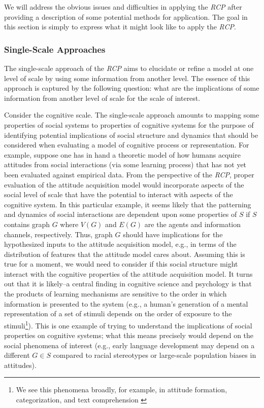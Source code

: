 \documentclass{article}
\begin{document}
We will address the obvious issues and difficulties in applying the \textit{RCP} after providing a description of some potential methods for application.  The goal in this section is simply to express what it might look like to apply the \textit{RCP}.  

\subsubsection{Single-Scale Approaches}
The single-scale approach of the \textit{RCP} aims to elucidate or refine a model at one level of scale by using some information from another level.  The essence of this approach is captured by the following question: what are the implications of some information from another level of scale for the scale of interest. 
 
Consider the cognitive scale. The single-scale approach amounts to mapping some properties of social systems to properties of cognitive systems for the purpose of identifying potential implications of social structure and dynamics that should be considered when evaluating a model of cognitive process or representation.  For example, suppose one has in hand a theoretic model of how humans acquire attitudes from social interactions (via some learning process) that has not yet been evaluated against empirical data.  From the perspective of the \textit{RCP}, proper evaluation of the attitude acquisition model would incorporate aspects of the social level of scale that have the potential to interact with aspects of the cognitive system.  In this particular example, it seems likely that the patterning and dynamics of social interactions are dependent upon some properties of $S$ if $S$ contains graph $G$ where $V(G)$ and $E(G)$ are the agents and information channels, respectively. Thus, graph $G$ should have implications for the hypothesized inputs to the attitude acquisition model, e.g., in terms of the distribution of features that the attitude model cares about.  Assuming this is true for a moment, we would need to consider if this social structure might interact with the cognitive properties of the attitude acquisition model.  It turns out that it is likely--a central finding in cognitive science and psychology is that the products of learning mechanisms are sensitive to the order in which information is presented to the system (e.g., a human's generation of a mental representation of a set of stimuli depends on the order of exposure to the stimuli\footnote{We see this phenomena broadly, for example,  in attitude formation\cite{cacioppo1992rudimentary}, categorization\cite{heit1994models}, and text comprehension \cite{mcnamara1996learning}}).  This is one example of trying to understand the implications of social properties on cognitive systems; what this means precisely would depend on the social phenomena of interest (e.g., early language development may depend on a different $G \in S$ compared to racial stereotypes or large-scale population biases in attitudes).  
\end{document}
